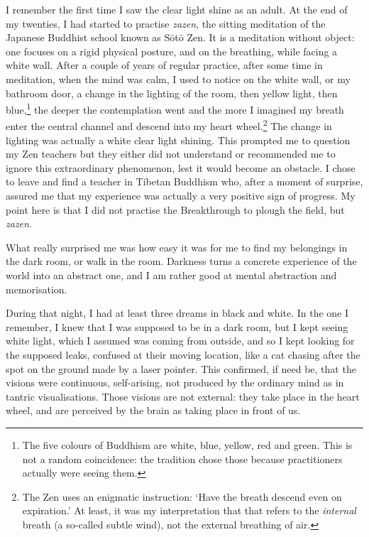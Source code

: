 \documentclass[11pt,twocolumn]{article}
\begin{document}
I remember the first time I saw the clear light shine as an adult. At
the end of my twenties, I had started to practise \emph{zazen}, the
sitting meditation of the Japanese Buddhist school known as Sōtō
Zen. It is a meditation without object: one focuses on a rigid
physical posture, and on the breathing, while facing a white
wall. After a couple of years of regular practice, after some time in
meditation, when the mind was calm, I used to notice on the white
wall, or my bathroom door, a change in the lighting of the room, then
yellow light, then blue,\footnote{The five colours of Buddhism are
white, blue, yellow, red and green. This is not a random coincidence:
the tradition chose those because practitioners actually were seeing
them.}  the deeper the contemplation went and the more I imagined my
breath enter the central channel and descend into my heart
wheel.\footnote{The Zen uses an enigmatic instruction: `Have the
breath descend even on expiration.' At least, it was my interpretation
that that refers to the \emph{internal} breath (a so\hyp{}called
subtle wind), not the external breathing of air.} The change in
lighting was actually a white clear light shining. This prompted me to
question my Zen teachers but they either did not understand or
recommended me to ignore this extraordinary phenomenon, lest it would
become an obstacle. I chose to leave and find a teacher in Tibetan
Buddhism who, after a moment of surprise, assured me that my
experience was actually a very positive sign of progress. My point
here is that I did not practise the Breakthrough to plough the field,
but \emph{zazen}.

What really surprised me was how easy it was for me to find my
belongings in the dark room, or walk in the room. Darkness turns a
concrete experience of the world into an abstract one, and I am rather
good at mental abstraction and memorisation.

During that night, I had at least three dreams in black and white. In
the one I remember, I knew that I was supposed to be in a dark room,
but I kept seeing white light, which I assumed was coming from
outside, and so I kept looking for the supposed leaks, confused at
their moving location, like a cat chasing after the spot on the ground
made by a laser pointer. This confirmed, if need be, that the visions
were continuous, self\hyp{}arising, not produced by the ordinary mind
as in tantric visualisations. Those visions are not external: they
take place in the heart wheel, and are perceived by the brain as
taking place in front of us.
\end{document}
